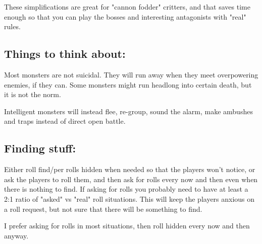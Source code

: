 These simplifications are great for "cannon fodder" critters, and that saves time enough so that you can play the bosses and interesting antagonists with "real" rules.


\subsection*{Things to think about:}

Most monsters are not suicidal. They will run away when they meet overpowering enemies, if they can. Some monsters might run headlong into certain death, but it is not the norm.

Intelligent monsters will instead flee, re-group, sound the alarm, make ambushes and traps instead of direct open battle.


\subsection*{Finding stuff:}

Either roll find/per rolls hidden when needed so that the players won't notice, or ask the players to roll them, and then ask for rolls every now and then even when there is nothing to find. If asking for rolls you probably need to have at least a 2:1 ratio of "asked" vs "real" roll situations. This will keep the players anxious on a roll request, but not sure that there will be something to find.

I prefer asking for rolls in most situations, then roll hidden every now and then anyway.


